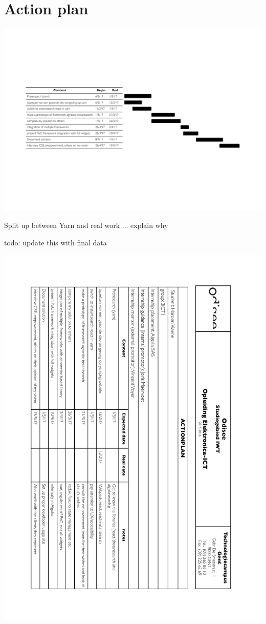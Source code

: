 
\chapter{Action plan}
\label{chp:action_plan}

\includegraphics[width=\textwidth]{../assets/action-plan-gantt.pdf}

Split up between Yarn and real work ... explain why

todo: update this with final data

\newpage

\includegraphics[width=\textwidth, height=0.95\textheight, keepaspectratio]{../assets/action-plan.pdf}
